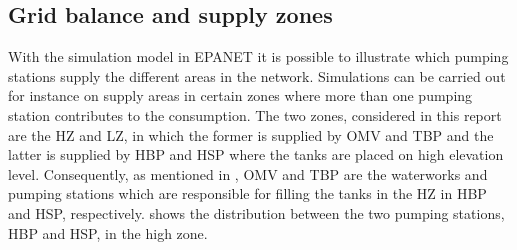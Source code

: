 \subsection{Grid balance and supply zones}
\label{grid_balance_supply_zones}

With the simulation model in EPANET it is possible to illustrate which pumping stations supply the different areas in the network. Simulations can be carried out for instance on supply areas in certain zones where more than one pumping station contributes to the consumption. The two zones, considered in this report are the HZ and LZ, in which the former is supplied by OMV and TBP and the latter is supplied by HBP and HSP where the tanks are placed on high elevation level. Consequently, as mentioned in , OMV and TBP are the waterworks and pumping stations which are responsible for filling the tanks in the HZ in HBP and HSP, respectively.  shows the distribution between the two pumping stations, HBP and HSP, in the high zone. 


